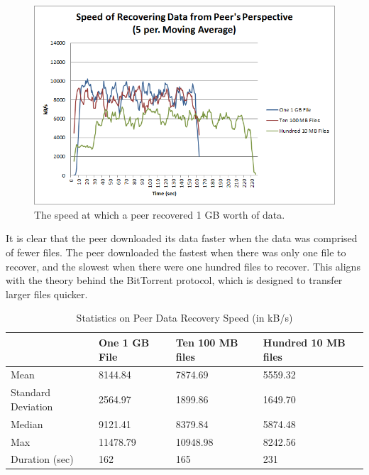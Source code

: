 \documentclass[12pt]{report}
\begin{document}
\begin{figure}
  \centerline{\includegraphics[scale=1]{figures/PeerRecoverySpeed}}
  \caption{The speed at which a peer recovered 1 GB worth of data. \label{fig:PeerRecoverySpeed}}
\end{figure}

It is clear that the peer downloaded its data faster when the data was comprised of fewer files. The peer downloaded the fastest when there was only one file to recover, and the slowest when there were one hundred files to recover. This aligns with the theory behind the BitTorrent protocol, which is designed to transfer larger files quicker.

\begin{table}
\begin{center}
    \begin{tabular}{| l | l | l | l |}
    \hline
    & One 1 GB File & Ten 100 MB files & Hundred 10 MB files \\ \hline
    Mean & 8144.84 & 7874.69 & 5559.32 \\ \hline
    Standard Deviation & 2564.97 & 1899.86 & 1649.70 \\ \hline
    Median & 9121.41 & 8379.84 & 5874.48 \\ \hline
    Max & 11478.79 & 10948.98 & 8242.56 \\ \hline
    Duration (sec) & 162 & 165 & 231 \\ \hline
    \end{tabular}
    \caption{Statistics on Peer Data Recovery Speed (in kB/s)}
    \label{tab:PeerRecoverySpeed}
\end{center}
\end{table}
\end{document}
